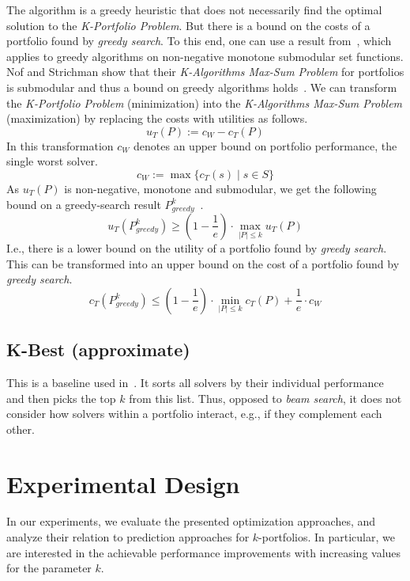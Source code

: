 \documentclass[conference]{IEEEtran}
\begin{document}
The algorithm is a greedy heuristic that does not necessarily find the optimal solution to the \emph{K-Portfolio Problem}. 
But there is a bound on the costs of a portfolio found by \emph{greedy search}. 
To this end, one can use a result from~\cite{nemhauser1978analysis}, which applies to greedy algorithms on non-negative monotone submodular set functions.
Nof and Strichman show that their \emph{K-Algorithms Max-Sum Problem} for portfolios is submodular and thus a bound on greedy algorithms holds~\cite{nof2020real}. 
We can transform the \emph{K-Portfolio Problem} (minimization) into the \emph{K-Algorithms Max-Sum Problem} (maximization) by replacing the costs with utilities as follows.%
$$
u_{T}(P) := c_W - c_{T}(P)
$$
In this transformation $c_W$ denotes an upper bound on portfolio performance, the single worst solver.%
$$
c_W := \max\{c_T(s) \mid s \in S\}
$$
As $u_{T}(P)$ is non-negative, monotone and submodular, we get the following bound on a greedy-search result $P_{greedy}^k$~\cite{nemhauser1978analysis, krause2014submodular}.%
$$
	u_{T}(P_{greedy}^k) \geq (1 - \frac{1}{e}) \cdot \max_{|P| \leq k}{u_{T}(P)}
$$
I.e., there is a lower bound on the utility of a portfolio found by \emph{greedy search}.
This can be transformed into an upper bound on the cost of a portfolio found by \emph{greedy search}.%
\begin{equation}
	c_{T}(P_{greedy}^k) \leq (1 - \frac{1}{e}) \cdot \min_{|P| \leq k}{c_{T}(P)} + \frac{1}{e} \cdot c_W
	\label{eq:upper-bound}
\end{equation}

\subsection{K-Best (approximate)}

This is a baseline used in~\cite{nof2020real}.
It sorts all solvers by their individual performance and then picks the top $k$ from this list.
Thus, opposed to \emph{beam search}, it does not consider how solvers within a portfolio interact, e.g., if they complement each other.

\section{Experimental Design}
\label{sec:experimental-design}

In our experiments, we evaluate the presented optimization approaches, and analyze their relation to prediction approaches for $k$-portfolios. 
In particular, we are interested in the achievable performance improvements with increasing values for the parameter $k$. 
\end{document}
